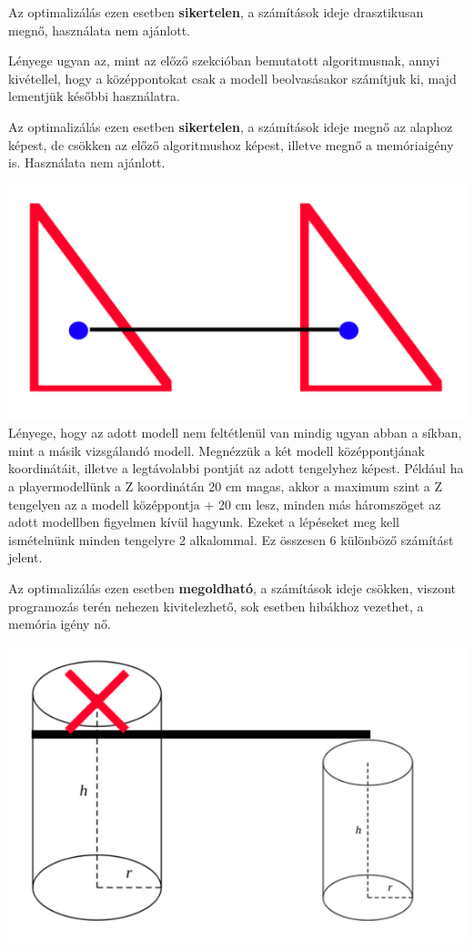 Az optimalizálás ezen esetben \textbf{sikertelen}, a számítások ideje drasztikusan megnő, használata nem ajánlott.

Lényege ugyan az, mint az előző szekcióban bemutatott algoritmusnak, annyi kivétellel, hogy a középpontokat csak a modell beolvasásakor számítjuk ki, majd lementjük későbbi használatra.

Az optimalizálás ezen esetben \textbf{sikertelen}, a számítások ideje megnő az alaphoz képest, de csökken az előző algoritmushoz képest, illetve megnő a memóriaigény is. Használata nem ajánlott.

\includegraphics[width=13truecm, height=7.5truecm]{images/opt_5.2.png}\\
\newpage
{}
Lényege, hogy az adott modell nem feltétlenül van mindig ugyan abban a síkban, mint a másik vizsgálandó modell. Megnézzük a két modell középpontjának koordinátáit, illetve a legtávolabbi pontját az adott tengelyhez képest. Például ha a playermodellünk a Z koordinátán 20 cm magas, akkor a maximum szint a Z tengelyen az a modell középpontja + 20 cm lesz, minden más háromszöget az adott modellben figyelmen kívül hagyunk. Ezeket a lépéseket meg kell ismételnünk minden tengelyre 2 alkalommal. Ez összesen 6 különböző számítást jelent.

Az optimalizálás ezen esetben \textbf{megoldható}, a számítások ideje csökken, viszont programozás terén nehezen kivitelezhető, sok esetben hibákhoz vezethet, a memória igény nő.

\includegraphics[width=13truecm, height=7.5truecm]{images/opt_5.3.png}\\


